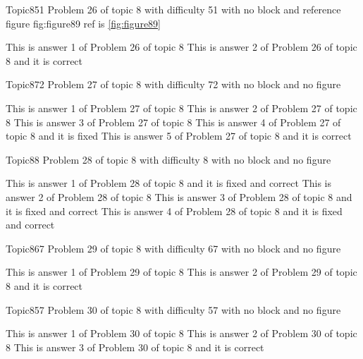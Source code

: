 \documentclass[master]{exam}
\begin{document}
\begin{problem}{Topic8}{51}
	Problem 26 of topic 8 with difficulty 51 with no block and reference figure fig:figure89 ref is \ref{fig:figure89}
	\begin{answers}
		\answer This is answer 1 of Problem 26 of topic 8 
		\answer[correct] This is answer 2 of Problem 26 of topic 8 and it is correct
	\end{answers}
\end{problem}

\begin{problem}{Topic8}{72}
	Problem 27 of topic 8 with difficulty 72 with no block and no figure
	\begin{answers}
		\answer This is answer 1 of Problem 27 of topic 8 
		\answer This is answer 2 of Problem 27 of topic 8 
		\answer This is answer 3 of Problem 27 of topic 8 
		\answer[fixed] This is answer 4 of Problem 27 of topic 8 and it is fixed
		\answer[correct] This is answer 5 of Problem 27 of topic 8 and it is correct
	\end{answers}
\end{problem}

\begin{problem}{Topic8}{8}
	Problem 28 of topic 8 with difficulty 8 with no block and no figure
	\begin{answers}
		 This is answer 1 of Problem 28 of topic 8 and it is fixed and correct
		\answer This is answer 2 of Problem 28 of topic 8 
		 This is answer 3 of Problem 28 of topic 8 and it is fixed and correct
		 This is answer 4 of Problem 28 of topic 8 and it is fixed and correct
	\end{answers}
\end{problem}

\begin{problem}{Topic8}{67}
	Problem 29 of topic 8 with difficulty 67 with no block and no figure
	\begin{answers}
		\answer This is answer 1 of Problem 29 of topic 8 
		\answer[correct] This is answer 2 of Problem 29 of topic 8 and it is correct
	\end{answers}
\end{problem}

\begin{problem}{Topic8}{57}
	Problem 30 of topic 8 with difficulty 57 with no block and no figure
	\begin{answers}
		\answer This is answer 1 of Problem 30 of topic 8 
		\answer This is answer 2 of Problem 30 of topic 8 
		\answer[correct] This is answer 3 of Problem 30 of topic 8 and it is correct
	\end{answers}
\end{problem}
\end{document}
